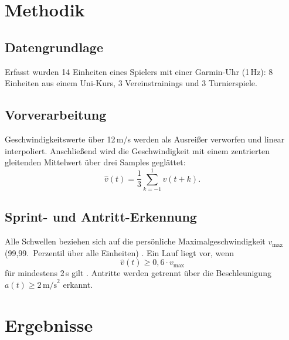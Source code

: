 \documentclass[journal]{IEEEtran}
\begin{document}

\section{Methodik}

\subsection{Datengrundlage}
Erfasst wurden 14 Einheiten eines Spielers mit einer Garmin-Uhr (1\,Hz):
8 Einheiten aus einem Uni-Kurs, 3 Vereinstrainings und 3 Turnierspiele.


\subsection{Vorverarbeitung}
Geschwindigkeitswerte über 12\,m/s werden als Ausreißer verworfen und linear
interpoliert. Anschließend wird die Geschwindigkeit mit einem zentrierten
gleitenden Mittelwert über drei Samples geglättet:
\begin{equation}
  \hat{v}(t) = \frac{1}{3}\sum_{k=-1}^{1} v(t+k).
\end{equation}

\subsection{Sprint- und Antritt-Erkennung}
Alle Schwellen beziehen sich auf die persönliche Maximalgeschwindigkeit
$v_{\max}$ (99,99.~Perzentil über alle Einheiten) \cite{sfs_metrics}.
Ein Lauf liegt vor, wenn
\begin{equation}
  \hat{v}(t) \geq 0{,}6 \cdot v_{\max}
\end{equation}
für mindestens 2\,s gilt \cite{sfs_validity}. Antritte werden getrennt über die
Beschleunigung $a(t) \geq 2\,\text{m/s}^2$ erkannt.


\section{Ergebnisse}
\end{document}
